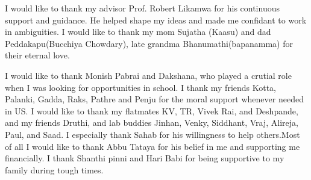 \begin{acknowledgements}
		I would like to thank my advisor Prof. Robert Likamwa for his continuous support and guidance. He helped shape my ideas and made me confidant to work in ambiguities. I would like to thank my mom Sujatha (Kaasu) and dad Peddakapu(Bucchiya Chowdary), late grandma Bhanumathi(bapanamma) for their eternal love.%
	
	I would like to thank Monish Pabrai and Dakshana, who played a crutial role when I was looking for opportunities in school. %
	I thank my friends Kotta, Palanki, Gadda, Raks, Pathre and Penju for  the moral support whenever needed in US. I would like to thank my flatmates KV, TR, Vivek Rai, and Deshpande, and my friends Druthi, and lab buddies Jinhan, Venky, Siddhant, Vraj, Alireja, Paul, and Saad. I especially thank Sahab for his willingness to help others.Most of all I would like to thank Abbu Tataya for his belief in me and supporting me financially. I thank Shanthi pinni and Hari Babi for being supportive to my family during tough times.  
	

\end{acknowledgements}